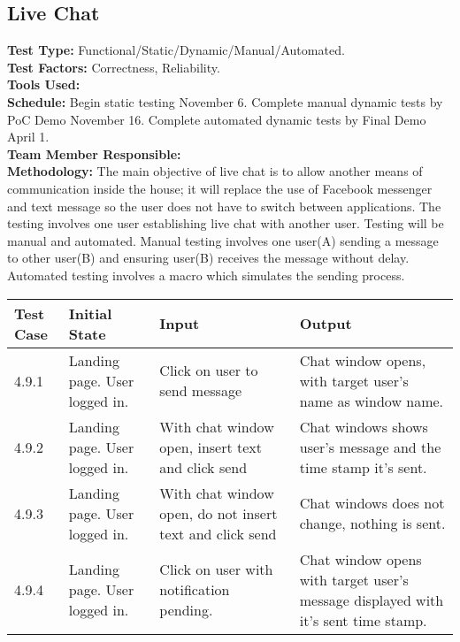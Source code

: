 \documentclass[12pt]{article}
\begin{document}
\subsection{Live Chat}
\textbf{Test Type:} Functional/Static/Dynamic/Manual/Automated. \\
\textbf{Test Factors:} Correctness, Reliability. \\
\textbf{Tools Used:} \\
\textbf{Schedule:} Begin static testing November 6. Complete manual dynamic tests by PoC Demo November 16. Complete automated dynamic tests by Final Demo April 1. \\
\textbf{Team Member Responsible:} \\
\textbf{Methodology:} The main objective of live chat is to allow another means of communication inside the house; it will replace the use of Facebook messenger and text message so the user does not have to switch between applications. The testing involves one user establishing live chat with another user. Testing will be manual and automated. Manual testing involves one user(A) sending a message to other user(B) and ensuring user(B) receives the message without delay. Automated testing involves a macro which simulates the sending process.
\newline
\newline
\newline
\newline
\begin{longtable}{|p{2cm}|p{3cm}|p{5cm}|p{5cm}|}
    \hline
    \textbf{Test Case}  & \textbf{Initial State} & \textbf{Input} & \textbf{Output} \\ \hline
    4.9.1 & Landing page. User logged in. & Click on user to send message & Chat window opens, with target user's name as window name. \\ 
    \hline
    4.9.2 & Landing page. User logged in. & With chat window open, insert text and click send & Chat windows shows user's message and the time stamp it's sent. \\ 
    \hline
    4.9.3 & Landing page. User logged in. & With chat window open, do not insert text and click send & Chat windows does not change, nothing is sent. \\ 
    \hline
    4.9.4 & Landing page. User logged in. & Click on user with notification pending. & Chat window opens with target user's message displayed with it's sent time stamp. \\
    \hline
\end{longtable}
\end{document}
